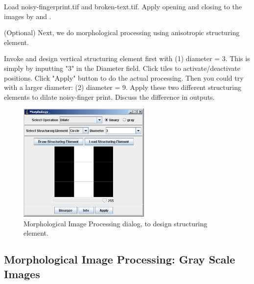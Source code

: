 \begin{indentexercise}{1}
Load noisy-fingerprint.tif and broken-text.tif. Apply
opening and closing to the images by  and . 
\end{indentexercise}


\begin{indentexercise}{2}
(Optional) Next, we do morphological processing using anisotropic structuring
element. 

Invoke  and design vertical structuring element first with (1)
diameter = 3. This is simply by inputting
"3" in the Diameter field. Click tiles
to activate/deactivate positions. Click
"Apply" button to do the actual
processing. Then you could try with a larger diameter: (2) diameter =
9. Apply these two different structuring elements to dilate
noisy-finger print. Discuss the difference in outputs. 


\begin{figure}[htbp]
\begin{center}
\includegraphics[width=6.5cm]{fig/CMCIBasicCourse201102-img68.png}
\caption{ Morphological Image Processing dialog, to design structuring element.}
\label{fig:img68}
\end{center}
\end{figure}
\end{indentexercise}

\subsection{Morphological Image Processing: Gray Scale Images}

